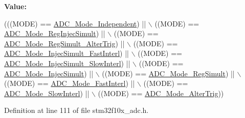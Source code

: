{\bfseries Value\+:}
\begin{DoxyCode}
(((MODE) == \hyperlink{group___a_d_c__mode_ga2754d3a35559dc10e3d6a7d920e83432}{ADC\_Mode\_Independent}) || \(\backslash\)
                           ((MODE) == \hyperlink{group___a_d_c__mode_ga487d5f0c506291c5d37b53198396fd1c}{ADC\_Mode\_RegInjecSimult}) || \(\backslash\)
                           ((MODE) == \hyperlink{group___a_d_c__mode_gae3d5fbf93f60d75534364bf9db78f632}{ADC\_Mode\_RegSimult\_AlterTrig}) || \(\backslash\)
                           ((MODE) == \hyperlink{group___a_d_c__mode_ga2fc8a737f7b2375309bccbcb7fdbbfeb}{ADC\_Mode\_InjecSimult\_FastInterl}) || \(\backslash\)
                           ((MODE) == \hyperlink{group___a_d_c__mode_gacb72230cb48a577907729d426be69c22}{ADC\_Mode\_InjecSimult\_SlowInterl}) || \(\backslash\)
                           ((MODE) == \hyperlink{group___a_d_c__mode_ga2339cc471aaf2db02daa4aeb49e9f0d9}{ADC\_Mode\_InjecSimult}) || \(\backslash\)
                           ((MODE) == \hyperlink{group___a_d_c__mode_ga71298f7453c2b4392a9c622328b3c93d}{ADC\_Mode\_RegSimult}) || \(\backslash\)
                           ((MODE) == \hyperlink{group___a_d_c__mode_ga843ecdd53625e2088e91819e43106a7a}{ADC\_Mode\_FastInterl}) || \(\backslash\)
                           ((MODE) == \hyperlink{group___a_d_c__mode_ga8b81e27e98dbc3d1e31452dbad167cd5}{ADC\_Mode\_SlowInterl}) || \(\backslash\)
                           ((MODE) == \hyperlink{group___a_d_c__mode_ga5595f12dc485e301ba3bad0e165586c1}{ADC\_Mode\_AlterTrig}))
\end{DoxyCode}


Definition at line 111 of file stm32f10x\+\_\+adc.\+h.


